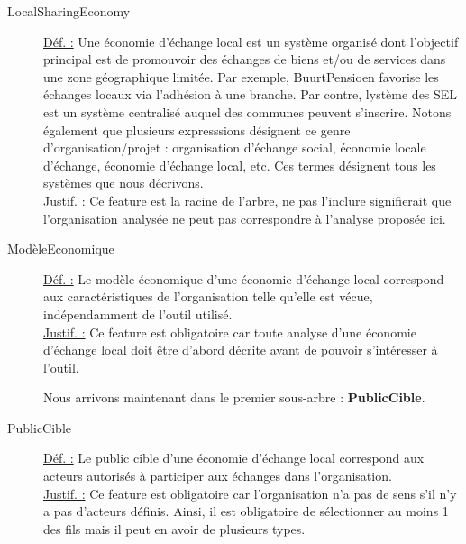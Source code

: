 \begin{description}

\item [LocalSharingEconomy]
\underline{Déf. :}  Une économie d'échange local est un système organisé dont l'objectif principal est de promouvoir des échanges de biens et/ou de services dans une zone géographique limitée.  Par exemple,  BuurtPensioen favorise les échanges locaux via l'adhésion à une branche.  Par contre,  lystème des SEL est un système centralisé auquel des communes peuvent s'inscrire.   Notons également que plusieurs expresssions désignent ce genre d'organisation/projet : organisation d'échange social,  économie locale d'échange,  économie d'échange local,  etc.  Ces termes désignent tous les systèmes que nous décrivons.
\\ \underline{Justif. :}  Ce feature est la racine de l'arbre,  ne pas l'inclure signifierait que l'organisation analysée ne peut pas correspondre à l'analyse proposée ici.
\newline

\item [ModèleEconomique]
\underline{Déf. :}  Le modèle économique d'une économie d'échange local correspond aux caractéristiques de l'organisation telle qu'elle est vécue,  indépendamment de l'outil utilisé.
\\ \underline{Justif. :}  Ce feature est obligatoire car toute analyse d'une économie d'échange local doit être d'abord décrite avant de pouvoir s'intéresser à l'outil.
\newline

Nous arrivons maintenant dans le premier sous-arbre : \textbf{PublicCible}.
\newline
\begin{center}
\end{center}

\item [PublicCible]
\underline{Déf. :}  Le public cible d'une économie d'échange local correspond aux acteurs autorisés à participer aux échanges dans l'organisation.
\\ \underline{Justif. :}  Ce feature est obligatoire car l'organisation n'a pas de sens s'il n'y a pas d'acteurs définis.  Ainsi,  il est obligatoire de sélectionner au moins 1 des fils mais il peut en avoir de plusieurs types.  
\newline


\end{description}
